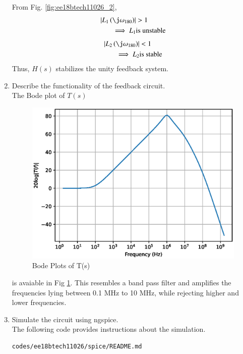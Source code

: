 \begin{enumerate}[label=\arabic*.,ref=\theenumi]
From Fig. \ref{fig:ee18btech11026_2},
\begin{align}
\abs{L_1\brak{\j\omega_{180}}} &> 1 
\\
\implies L_{1} &\text{is unstable}
\end{align}
\begin{align}
\abs{L_2\brak{\j\omega_{180}}} & < 1 
\\
\implies L_{2} &\text{is stable}
\end{align}
%
Thus, $H(s)$ stabilizes the unity feedback system.
\item Describe the functionality of the feedback circuit.
\\
\solution
The Bode plot of $T(s)$
\begin{figure}[!h]
    \centering
    \includegraphics[width=\columnwidth]{./figs/ee18btech11026/Bodeplot.eps}
    \caption{Bode Plots of T(s)}
    \label{fig:ee18btech11026_bode}
\end{figure}
is avaiable in  Fig \ref{fig:ee18btech11026_bode}. This resembles a band pass filter and amplifies the frequencies lying between 0.1 MHz to 10 MHz, while rejecting higher and lower frequencies.
%
\item Simulate the circuit using ngspice.
%
\\
\solution 
The following code provides instructions about the simulation.
\begin{lstlisting}
codes/ee18btech11026/spice/README.md
\end{lstlisting}


\end{enumerate}
